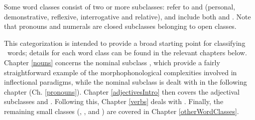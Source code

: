 Some word classes consist of two or more subclasses: %
 refer to  %
and  (personal, demonstrative, reflexive, interrogative and relative), and  include both  and . %
Note that pronouns and numerals are closed subclasses belonging to open classes.

This categorization is intended to provide a broad starting point for classifying \PS\ words; details for each word class can be found in the relevant chapters below. 
Chapter \ref{nouns} concerns the nominal subclass , which provide a fairly straightforward example of the morphophonological complexities involved in inflectional paradigms, while 
the nominal subclass  is dealt with in the following chapter (Ch. \ref{pronouns}). %
Chapter \ref{adjectivesIntro} then covers the adjectival subclasses  and . Following this, Chapter \ref{verbs} deals with . Finally, the remaining small classes (, ,  %
and ) are covered in Chapter \ref{otherWordClasses}. 

